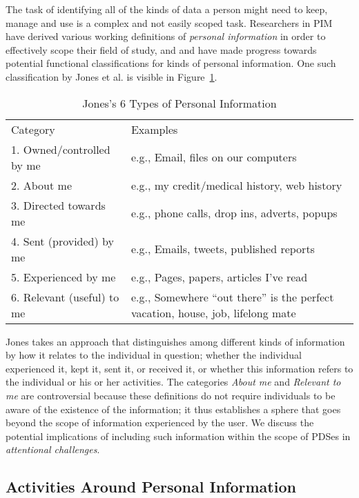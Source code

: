 \documentclass[graybox]{svmult}
\begin{document}
The task of identifying all of the kinds of data a person might need to keep, manage and use is a complex and not easily scoped task.  Researchers in PIM have derived various working definitions of \emph{personal information} in order to effectively scope their field of study, and and have made progress towards potential functional classifications for kinds of personal information. One such classification by Jones et al. \cite{kftf} is visible in Figure~\ref{fig:jonestype}.

\begin{table}
\begin{tabular}{p{4cm} p{8cm}}
Category & Examples \\
1. Owned/controlled by me & e.g., Email, files on our computers  \\
2. About me	& e.g., my credit/medical history, web history \\
3. Directed towards me & e.g., phone calls, drop ins, adverts, popups \\
4. Sent (provided) by me & e.g.,  Emails, tweets, published reports  \\
5. Experienced by me & e.g.,  Pages, papers, articles I’ve read \\
6. Relevant (useful) to me	& e.g.,  Somewhere ``out there'' is the perfect vacation, house, job, lifelong mate \\
\end{tabular}
\caption{Jones's 6 Types of Personal Information \cite{kftf}}
\label{fig:jonestype}
\end{table}

Jones takes an approach that distinguishes among different kinds of information by how it relates to the individual in question; whether the individual experienced it, kept it, sent it, or received it, or whether this information refers to the individual or his or her activities.  The categories \emph{About me} and \emph{Relevant to me} are controversial because these definitions do not require individuals to be aware of the existence of the information; it thus establishes a sphere that goes beyond the scope of information experienced by the user.  We discuss the potential implications of including such information within the scope of PDSes in \emph{attentional challenges}. 


\subsection{Activities Around Personal Information}
\end{document}
